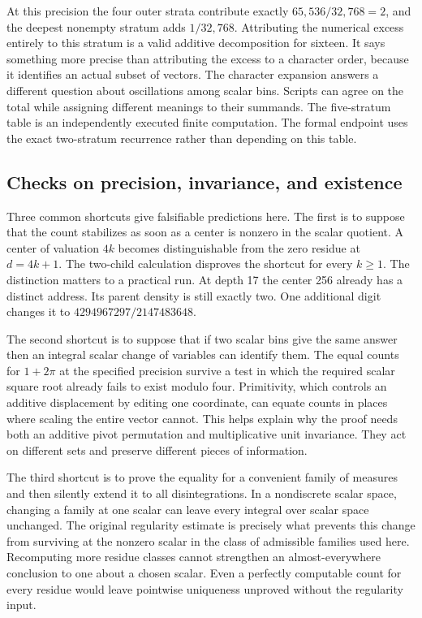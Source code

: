 \documentclass[12pt,letterpaper]{article}
\begin{document}
At this precision the four outer strata contribute exactly $65{,}536/32{,}768=2$, and the deepest nonempty stratum adds $1/32{,}768$. Attributing the numerical excess entirely to this stratum is a valid additive decomposition for sixteen. It says something more precise than attributing the excess to a character order, because it identifies an actual subset of vectors. The character expansion answers a different question about oscillations among scalar bins. Scripts can agree on the total while assigning different meanings to their summands. The five-stratum table is an independently executed finite computation. The formal endpoint uses the exact two-stratum recurrence rather than depending on this table.

\subsection{Checks on precision, invariance, and existence}
Three common shortcuts give falsifiable predictions here. The first is to suppose that the count stabilizes as soon as a center is nonzero in the scalar quotient. A center of valuation $4k$ becomes distinguishable from the zero residue at $d=4k+1$. The two-child calculation disproves the shortcut for every $k\ge1$. The distinction matters to a practical run. At depth 17 the center 256 already has a distinct address. Its parent density is still exactly two. One additional digit changes it to $4294967297/2147483648$.

The second shortcut is to suppose that if two scalar bins give the same answer then an integral scalar change of variables can identify them. The equal counts for $1+2\pi$ at the specified precision survive a test in which the required scalar square root already fails to exist modulo four. Primitivity, which controls an additive displacement by editing one coordinate, can equate counts in places where scaling the entire vector cannot. This helps explain why the proof needs both an additive pivot permutation and multiplicative unit invariance. They act on different sets and preserve different pieces of information.

The third shortcut is to prove the equality for a convenient family of measures and then silently extend it to all disintegrations. In a nondiscrete scalar space, changing a family at one scalar can leave every integral over scalar space unchanged. The original regularity estimate is precisely what prevents this change from surviving at the nonzero scalar in the class of admissible families used here. Recomputing more residue classes cannot strengthen an almost-everywhere conclusion to one about a chosen scalar. Even a perfectly computable count for every residue would leave pointwise uniqueness unproved without the regularity input.
\end{document}
